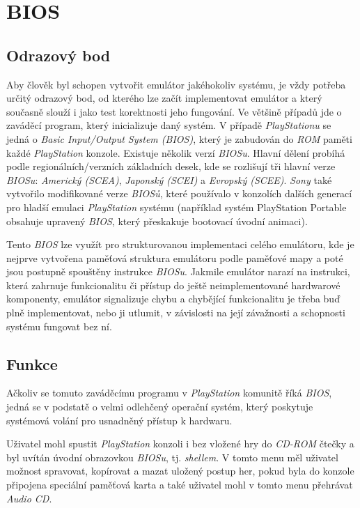 \chapter{BIOS}

\section{Odrazový bod}

Aby člověk byl schopen vytvořit emulátor jakéhokoliv systému, je vždy potřeba určitý odrazový bod, od kterého lze
začít implementovat emulátor a který současně slouží i jako test korektnosti jeho fungování. Ve většině případů jde o zaváděcí
program, který inicializuje daný systém. V případě \textit{PlayStationu} se jedná o \textit{Basic Input/Output System (BIOS)},
který je zabudován do \textit{ROM} paměti každé \textit{PlayStation} konzole. Existuje několik verzí \textit{BIOSu}.
Hlavní dělení probíhá podle regionálních/verzních základních desek, kde se rozlišují tři hlavní verze \textit{BIOSu}: \textit{Americký (SCEA)},
\textit{Japonský (SCEI)} a \textit{Evropský (SCEE)}. \textit{Sony} také vytvořilo modifikované verze \textit{BIOSů}, které používalo v konzolích
dalších generací pro hladší emulaci \textit{PlayStation} systému (například systém PlayStation Portable obsahuje upravený \textit{BIOS}, který
přeskakuje bootovací úvodní animaci).

Tento \textit{BIOS} lze využít pro strukturovanou implementaci celého emulátoru, kde je nejprve vytvořena paměťová struktura emulátoru
podle paměťové mapy a poté jsou postupně spouštěny instrukce \textit{BIOSu}. Jakmile emulátor narazí na instrukci, která zahrnuje funkcionalitu
či přístup do ještě neimplementované hardwarové komponenty, emulátor signalizuje chybu a chybějící funkcionalitu je třeba buď plně
implementovat, nebo ji utlumit, v závislosti na její závažnosti a schopnosti systému fungovat bez ní.

\section{Funkce}

Ačkoliv se tomuto zaváděcímu programu v \textit{PlayStation} komunitě říká \textit{BIOS}, 
jedná se v podstatě o velmi odlehčený operační systém, který poskytuje systémová volání pro usnadněný přístup k hardwaru.

Uživatel mohl spustit \textit{PlayStation} konzoli i bez vložené hry do \textit{CD-ROM} 
čtečky a byl uvítán úvodní obrazovkou \textit{BIOSu}, tj. \textit{shellem}. 
V tomto menu měl uživatel možnost spravovat, kopírovat a mazat uložený postup her, pokud byla do konzole připojena speciální paměťová karta a také uživatel mohl
v tomto menu přehrávat \textit{Audio CD}.

